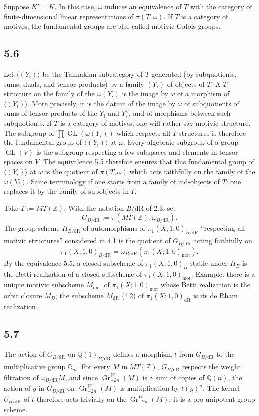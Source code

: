 \documentclass[11pt]{article}
\newcommand{\Q}{\mathbb Q}
\newcommand{\Z}{\mathbb Z}
\newcommand{\Gm}{\mathbb G_m}
\newcommand{\GL}{\operatorname{GL}}
\newcommand{\Gr}{\operatorname{Gr}}
\newcommand{\dR}{\mathrm{dR}}
\newcommand{\mot}{\mathrm{mot}}
\begin{document}
Suppose $K'=K$.
In this case, $\omega$ induces an equivalence of $T$ with the category of finite-dimensional linear representations of $\pi(T,\omega)$.
If $T$ is a category of motives, the fundamental groups are also called motivic Galois groups.

\subsection*{5.6}
Let $\langle(Y_i)\rangle$ be the Tannakian subcategory of $T$ generated (by subquotients, sums, duals, and tensor products) by a family $(Y_i)$ of objects of $T$.
A $T$-structure on the family of the $\omega(Y_i)$ is the image by $\omega$ of a morphism of $\langle(Y_i)\rangle$.
More precisely, it is the datum of the image by $\omega$ of subquotients of sums of tensor products of the $Y_i$ and $Y_i^\vee$, and of morphisms between such subquotients.
If $T$ is a category of motives, one will rather say motivic structure.
The subgroup of $\prod\GL(\omega(Y_i))$ which respects all $T$-structures is therefore the fundamental group of $\langle(Y_i)\rangle$ at $\omega$.
Every algebraic subgroup of a group $\GL(V)$ is the subgroup respecting a few subspaces and elements in tensor spaces on $V$.
The equivalence 5.5 therefore ensures that this fundamental group of $\langle(Y_i)\rangle$ at $\omega$ is the quotient of $\pi(T,\omega)$ which acts faithfully on the family of the $\omega(Y_i)$.
Same terminology if one starts from a family of ind-objects of $T$: one replaces it by the family of subobjects in $T$.

Take $T:=MT(\Z)$.
With the notation $B/\dR$ of 2.3, set
\begin{equation}
 G_{B/\dR}:=\pi(MT(\Z),\omega_{B/\dR}).
\tag{5.6.1}
\end{equation}
The group scheme $H_{B/\dR}$ of automorphisms of $\pi_1(X;1,0)_{B/\dR}$ ``respecting all motivic structures'' considered in 4.1 is the quotient of $G_{B/\dR}$ acting faithfully on
\[
 \pi_1(X;1,0)_{B/\dR}=\omega_{B/\dR}(\pi_1(X;1,0)_{\mot}).
\]
By the equivalence 5.5, a closed subscheme of $\pi_1(X;1,0)_B$ stable under $H_B$ is the Betti realization of a closed subscheme of $\pi_1(X;1,0)_{\mot}$.
Example: there is a unique motivic subscheme $M_{\mot}$ of $\pi_1(X;1,0)_{\mot}$ whose Betti realization is the orbit closure $M_B$; the subscheme $M_{\dR}$ (4.2) of $\pi_1(X;1,0)_{\dR}$ is its de Rham realization.

\subsection*{5.7}
The action of $G_{B/\dR}$ on $\Q(1)_{B/\dR}$ defines a morphism $t$ from $G_{B/\dR}$ to the multiplicative group $\Gm$.
For every $M$ in $MT(\Z)$, $G_{B/\dR}$ respects the weight filtration of $\omega_{B/\dR}M$, and since $\Gr^W_{-2n}(M)$ is a sum of copies of $\Q(n)$, the action of $g$ in $G_{B/\dR}$ on $\Gr^W_{-2n}(M)$ is multiplication by $t(g)^n$.
The kernel $U_{B/\dR}$ of $t$ therefore acts trivially on the $\Gr^W_{-2n}(M)$: it is a pro-unipotent group scheme.
\end{document}
